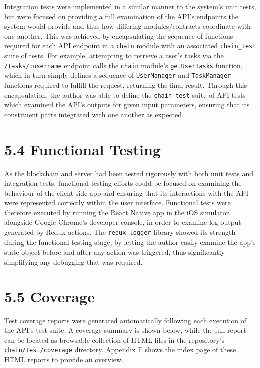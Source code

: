 Integration tests were implemented in a similar manner to the system's
unit tests, but were focused on providing a full examination of the
API's endpoints the system would provide and thus how differing
modules/contracts coordinate with one another. This was achieved by
encapsulating the sequence of functions required for each API endpoint
in a \texttt{chain} module with an associated \texttt{chain\_test} suite
of tests. For example, attempting to retrieve a user's tasks via the
\texttt{/tasks/:username} endpoint calls the \texttt{chain} module's
\texttt{getUserTasks} function, which in turn simply defines a sequence
of \texttt{UserManager} and \texttt{TaskManager} functions required to
fulfill the request, returning the final result. Through this
encapsulation, the author was able to define the \texttt{chain\_test}
suite of API tests which examined the API's outputs for given input
parameters, ensuring that its constituent parts integrated with one
another as expected.

\section{5.4 Functional Testing}\label{functional-testing}

As the blockchain and server had been tested rigorously with both unit
tests and integration tests, functional testing efforts could be focused
on examining the behaviour of the client-side app and ensuring that its
interactions with the API were represented correctly within the user
interface. Functional tests were therefore executed by running the React
Native app in the iOS simulator alongside Google Chrome's developer
console, in order to examine log output generated by Redux actions. The
\texttt{redux-logger} library showed its strength during the functional
testing stage, by letting the author easily examine the app's state
object before and after any action was triggered, thus significantly
simplifying any debugging that was required.

\section{5.5 Coverage}\label{coverage}
Test coverage reports were generated automatically following each execution of the API's test suite. A coverage summary is shown below, while the full report can be located as browsable collection of HTML files in the repository's \texttt{chain/test/coverage} directory. Appendix E shows the index page of these HTML reports to provide an overview.

